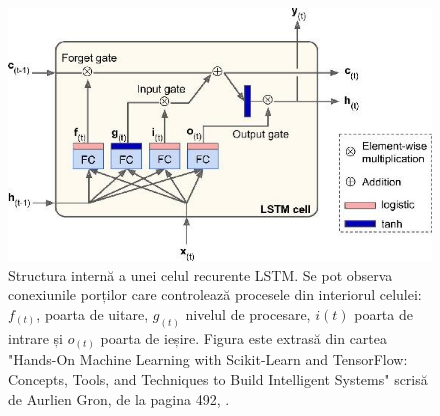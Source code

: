 \documentclass[a4paper,12pt]{book}
\begin{document}
				\begin{figure}[h]
					\centering
					\includegraphics[scale=0.5]{lstm}
					\caption{Structura internă a unei celul recurente LSTM. Se pot observa conexiunile porților care controlează procesele din interiorul celulei: $f_{(t)}$, poarta de uitare, $g_{(t)}$ nivelul de procesare, $i{(t)}$ poarta de intrare și $o_{(t)}$ poarta de ieșire. Figura este extrasă din cartea "Hands-On Machine Learning with Scikit-Learn and TensorFlow: Concepts, Tools, and Techniques to Build Intelligent Systems" scrisă de Aurlien Gron, de la pagina 492, \cite{hands}.}
					\label{fig:lstm}
				\end{figure} 
			
\end{document}
